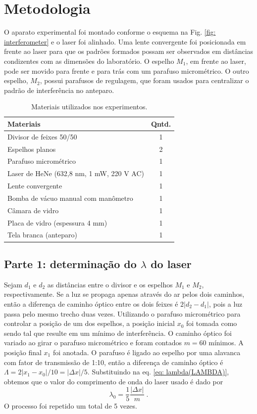 \section{Metodologia}

O aparato experimental foi montado conforme o esquema na Fig. \ref{fig: interferometer} e o laser foi alinhado. 
Uma lente convergente foi posicionada em frente ao laser para que os padrões formados possam ser observados em distâncias condizentes com as dimensões do laboratório. 
O espelho $M_1$, em frente ao laser, pode ser movido para frente e para trás com um parafuso micrométrico. 
O outro espelho, $M_2$, possui parafusos de regulagem, que foram usados para centralizar o padrão de interferência no anteparo. 

\begin{table}[h]
\centering
\caption{Materiais utilizados nos experimentos.}
\begin{tabular}{lc}
\toprule\midrule
\textbf{Materiais} & \textbf{Qntd.} \\
\midrule
 Divisor de feixes 50/50 &  1 \\
 Espelhos planos & 2 \\
 Parafuso micrométrico & 1 \\
 Laser de HeNe (632,8 nm, 1 mW, 220 V AC) & 1 \\
 Lente convergente & 1 \\
 Bomba de vácuo manual com manômetro &  1 \\
 Câmara de vidro & 1 \\
 Placa de vidro (espessura 4 mm) & 1 \\
 Tela branca (anteparo) & 1 \\
\midrule\bottomrule
\end{tabular}
\label{tab: materials}
\end{table}

\subsection*{Parte 1: determinação do $\lambda$ do laser}
Sejam $d_1$ e $d_2$ as distâncias entre o divisor e os espelhos $M_1$ e $M_2$, respectivamente.
Se a luz se propaga apenas através do ar pelos dois caminhos, então a diferença de caminho óptico entre os dois feixes é $2|d_2 - d_1|$, pois a luz passa pelo mesmo trecho duas vezes. 
Utilizando o parafuso micrométrico para controlar a posição de um dos espelhos, a posição inicial $x_0$ foi tomada como sendo tal que resulte em um mínimo de interferência. 
O caminho óptico foi variado ao girar o parafuso micrométrico e foram contados $m=60$ mínimos. 
A posição final $x_1$ foi anotada. 
O parafuso é ligado ao espelho por uma alavanca com fator de transmissão de 1:10, então a diferença de caminho óptico é $\Lambda = 2|x_1 - x_0|/10 = |\Delta x|/5.$
Substituindo na eq. \eqref{eq: lambda(LAMBDA)}, obtemos que o valor do comprimento de onda do laser usado é dado por 
\begin{equation}\label{eq: lambda(d)}
	\lambda_0 = \frac{1}{5} \frac{|\Delta x|}{m} \;.
\end{equation}
O processo foi repetido um total de 5 vezes.

